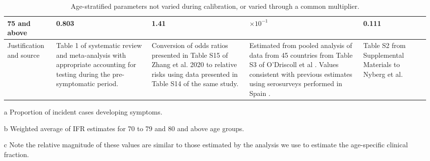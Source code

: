 \begin{table}
\begin{threeparttable}
\begin{tabularx}{\textwidth}{| X | X | X | X | X |}
        \hline
        75 and above & 0.803 & 1.41 & $\times10^{-1}$\tnote{b} & 0.111 \\
        \hline
        Justification and source & 
        Table 1 of systematic review and meta-analysis with appropriate accounting for testing during the pre-symptomatic period\cite{sah-2021}. & 
        Conversion of odds ratios presented in Table S15 of Zhang et al. 2020 to relative risks using data presented in Table S14 of the same study\cite{zhang-2020-a}\tnote{c}. &
        Estimated from pooled analysis of data from 45 countries from Table S3 of O'Driscoll et al \cite{odriscoll-2021}. 
        Values consistent with previous estimates using serosurveys performed in Spain \cite{pollan-2020}. &
        Table S2 from Supplemental Materials to Nyberg et al. \cite{nyberg-2022} \\ 
        \hline
	\end{tabularx}
	\caption{Age-stratified parameters not varied during calibration, or varied through a common multiplier.}
	\label{tab:age_params}
    \begin{tablenotes}
        \item[a] Proportion of incident cases developing symptoms.
        \item[b] Weighted average of IFR estimates for 70 to 79 and 80 and above age groups.
        \item[c] Note the relative magnitude of these values are similar to those estimated by the analysis we use to estimate the age-specific clinical fraction.
    \end{tablenotes}
    \end{threeparttable}
\end{table}
